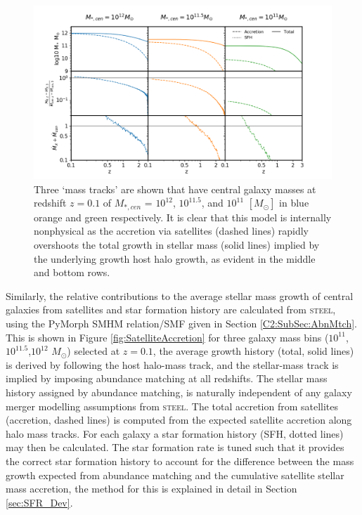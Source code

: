 \begin{figure}[h]
	\centering
	\includegraphics[width = \linewidth]{Figures/Chapter4/SatelliteAccretion_cMod.png}
    \caption{Three `mass tracks' are shown that have central galaxy masses at redshift $z = 0.1$ of $M_{*,cen}$ = $10^{12}$, $10^{11.5}$, and $10^{11}$ $[M_{\odot}]$ in blue orange and green respectively. It is clear that this model is internally nonphysical as the accretion via satellites (dashed lines) rapidly overshoots the total growth in stellar mass (solid lines) implied by the underlying growth host halo growth, as evident in the middle and bottom rows.}
	\label{fig:SatelliteAccretioncMod}
\end{figure}

Similarly, the relative contributions to the average stellar mass growth of central galaxies from satellites and star formation history are calculated from \textsc{steel}, using the PyMorph SMHM relation/SMF given in Section \ref{C2:SubSec:AbnMtch}. This is shown in Figure \ref{fig:SatelliteAccretion} for three galaxy mass bins ($10^{11}$,$10^{11.5}$,$10^{12}$ $M_{\odot}$) selected at $z = 0.1$, the average growth history (total, solid lines) is derived by following the host halo-mass track, and the stellar-mass track is implied by imposing abundance matching at all redshifts. The stellar mass history assigned by abundance matching, is naturally independent of any galaxy merger modelling assumptions from \textsc{steel}. The total accretion from satellites (accretion, dashed lines) is computed from the expected satellite accretion along halo mass tracks. For each galaxy a star formation history (SFH, dotted lines) may then be calculated. The star formation rate is tuned such that it provides the correct star formation history to account for the difference between the mass growth expected from abundance matching and the cumulative satellite stellar mass accretion, the method for this is explained in detail in Section \ref{sec:SFR_Dev}.

